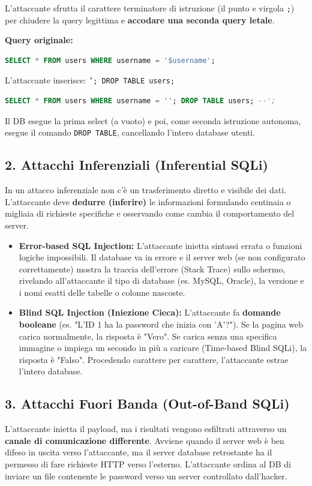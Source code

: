\begin{exbox}
L'attaccante sfrutta il carattere terminatore di istruzione (il punto e virgola \texttt{;}) per chiudere la query legittima e \textbf{accodare una seconda query letale}.

\textbf{Query originale:}
\begin{lstlisting}[language=SQL]
SELECT * FROM users WHERE username = '$username';
\end{lstlisting}
L'attaccante inserisce: \texttt{'; DROP TABLE users;}
\begin{lstlisting}[language=SQL]
SELECT * FROM users WHERE username = ''; DROP TABLE users; --';
\end{lstlisting}
Il DB esegue la prima select (a vuoto) e poi, come seconda istruzione autonoma, esegue il comando \texttt{DROP TABLE}, cancellando l'intero database utenti.
\end{exbox}

\subsection{2. Attacchi Inferenziali (Inferential SQLi)}
In un attacco inferenziale non c'è un trasferimento diretto e visibile dei dati. L'attaccante deve \textbf{dedurre (inferire)} le informazioni formulando centinaia o migliaia di richieste specifiche e osservando come cambia il comportamento del server.

\begin{itemize}
    \item \textbf{Error-based SQL Injection:} L'attaccante inietta sintassi errata o funzioni logiche impossibili. Il database va in errore e il server web (se non configurato correttamente) mostra la traccia dell'errore (Stack Trace) sullo schermo, rivelando all'attaccante il tipo di database (es. MySQL, Oracle), la versione e i nomi esatti delle tabelle o colonne nascoste.
    \item \textbf{Blind SQL Injection (Iniezione Cieca):} L'attaccante fa \textbf{domande booleane} (es. "L'ID 1 ha la password che inizia con 'A'?"). Se la pagina web carica normalmente, la risposta è "Vero". Se carica senza una specifica immagine o impiega un secondo in più a caricare (Time-based Blind SQLi), la risposta è "Falso". Procedendo carattere per carattere, l'attaccante estrae l'intero database.
\end{itemize}

\subsection{3. Attacchi Fuori Banda (Out-of-Band SQLi)}
L'attaccante inietta il payload, ma i risultati vengono esfiltrati attraverso un \textbf{canale di comunicazione differente}. Avviene quando il server web è ben difeso in uscita verso l'attaccante, ma il server database retrostante ha il permesso di fare richieste HTTP verso l'esterno. L'attaccante ordina al DB di inviare un file contenente le password verso un server controllato dall'hacker.



